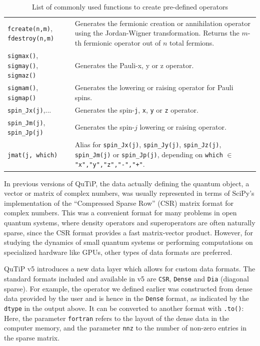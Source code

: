\documentclass[preprint,3p,sort&compress]{elsarticle}
\def\code#1{\texttt{#1}}
\begin{document}
\begin{table}[ht]
\begin{tabular}{@{}lp{9.6cm}@{}}
        \code{fcreate(n,m)}, \code{fdestroy(n,m)} & Generates the fermionic creation or annihilation operator using the Jordan-Wigner transformation. Returns the $m$-th fermionic operator out of $n$ total fermions.\\
       
        \code{sigmax()}, \code{sigmay()}, \code{sigmaz()} & Generates the Pauli-x, y or z operator. \\

        \code{sigmam()}, \code{sigmap()} & Generates the lowering or raising operator for Pauli spins. \\
 
        \code{spin\_Jx(j)},... & Generates the spin-\code{j}, \code{x}, \code{y} or \code{z} operator. \\

        \code{spin\_Jm(j)}, \code{spin\_Jp(j)} & Generates the spin-$j$ lowering or raising operator. \\
 
        \code{jmat(j, which)} & Alias for \code{spin\_Jx(j)}, \code{spin\_Jy(j)}, \code{spin\_Jz(j)}, \code{spin\_Jm(j)} or \code{spin\_Jp(j)}, depending on \code{which} $\in$ \code{"x","y","z","-","+"}. \\
        \bottomrule
    \end{tabular}
    \caption{List of commonly used functions to create pre-defined operators}
    \label{tab:qutip_operators_functions}
\end{table}

In previous versions of QuTiP, the data actually defining the quantum object, a vector or matrix of complex numbers, was usually represented in terms of SciPy's implementation of the ``Compressed Sparse Row'' (CSR) matrix format for complex numbers.  This was a convenient format for many problems in open quantum systems, where density operators and superoperators are often naturally sparse, since the CSR format provides a fast matrix-vector product. However, for studying the dynamics of small quantum systems or performing computations on specialized hardware like GPUs, other types of data formats are preferred.

QuTiP v5 introduces a new data layer which allows for custom data formats.  The standard formats included and available in v5 are \code{CSR}, \code{Dense} and \code{Dia} (diagonal sparse).  For example, the operator we defined earlier was constructed from dense data provided by the user and is hence in the \code{Dense} format, as indicated by the \code{dtype} in the output above. It can be converted to another format with \code{.to()}:
\newpage 
{}
%
Here, the parameter \code{fortran} refers to the layout of the dense data in the computer memory, and the parameter \code{nnz} to the number of non-zero entries in the sparse matrix.
\end{document}
